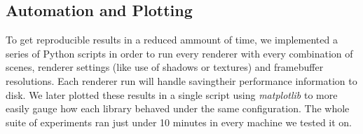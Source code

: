 \subsection{Automation and Plotting}
To get reproducible results in a reduced ammount of time, we implemented a series of Python scripts in order to run every renderer with every combination of scenes, renderer settings (like use of shadows or textures) and framebuffer resolutions. Each renderer run will handle savingtheir performance information to disk. We later plotted these results in a single script using \textit{matplotlib} to more easily gauge how each library behaved under the same configuration. The whole suite of experiments ran just under 10 minutes in every machine we tested it on.
